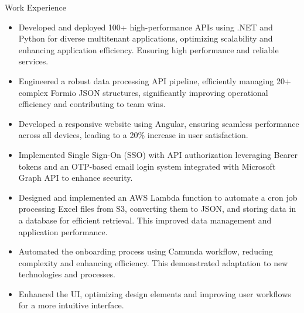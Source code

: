\documentclass{resume}
\begin{document}
\begin{experienceSection}{Work Experience}
    \experienceItem[
        company={EXL Digital},
        location={Noida Sec-144},
        position={FullStack Developer},
        duration={Aug 2023 – Present}
    ]
    \begin{itemize}
        \itemsep -6pt
        \item Developed and deployed 100+ high-performance APIs using .NET and Python for diverse multitenant applications, optimizing scalability and enhancing application efficiency.  Ensuring high performance and reliable services.
        \item Engineered a robust data processing API pipeline, efficiently managing 20+ complex Formio JSON structures, significantly improving operational efficiency and contributing to team wins.
        \item Developed a responsive website using Angular, ensuring seamless performance across all devices, leading to a 20\% increase in user satisfaction.
        \item Implemented Single Sign-On (SSO) with API authorization leveraging Bearer tokens and an OTP-based email login system integrated with Microsoft Graph API to enhance security.
        \item Designed and implemented an AWS Lambda function to automate a cron job processing Excel files from S3, converting them to JSON, and storing data in a database for efficient retrieval.  This improved data management and application performance.
        \item Automated the onboarding process using Camunda workflow, reducing complexity and enhancing efficiency.  This demonstrated adaptation to new technologies and processes.
    \end{itemize}

    \experienceItem[
        company={Nokia},
        location={Chennai},
        position={Web Developer Intern},
        duration={Jun 2018 – Jul 2018}
    ]
    \begin{itemize}
        \itemsep -6pt
        \item Enhanced the UI, optimizing design elements and improving user workflows for a more intuitive interface.
    \end{itemize}

\end{experienceSection}
\end{document}
